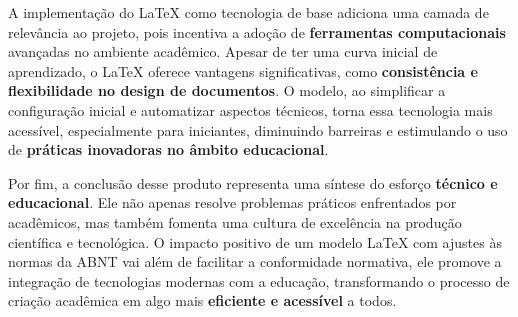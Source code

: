 A implementação do LaTeX como tecnologia de base adiciona uma camada de relevância ao projeto, pois incentiva a adoção de \textbf{ferramentas computacionais} avançadas no ambiente acadêmico. Apesar de ter uma curva inicial de aprendizado, o LaTeX oferece vantagens significativas, como \textbf{consistência e flexibilidade no design de documentos}. O modelo, ao simplificar a configuração inicial e automatizar aspectos técnicos, torna essa tecnologia mais acessível, especialmente para iniciantes, diminuindo barreiras e estimulando o uso de \textbf{práticas inovadoras no âmbito educacional}.

Por fim, a conclusão desse produto representa uma síntese do esforço \textbf{técnico e educacional}. Ele não apenas resolve problemas práticos enfrentados por acadêmicos, mas também fomenta uma cultura de excelência na produção científica e tecnológica. O impacto positivo de um modelo LaTeX com ajustes às normas da ABNT vai além de facilitar a conformidade normativa, ele promove a integração de tecnologias modernas com a educação, transformando o processo de criação acadêmica em algo mais \textbf{eficiente e acessível} a todos.








